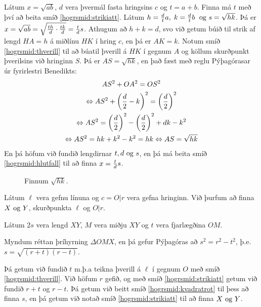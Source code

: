 \begin{frame}[allowframebreaks]
  \begin{hogrsmid}\label{hogrsmid:kvadratrot}
    Látum \(x = \sqrt{ab}\), \(d\) vera þvermál fasta hringsins \(c\)
    og \(t = a+b\).
    Finna má \(t\) með því að beita smíð \ref{hogrsmid:strikiatt}.
    Látum \(h =\frac{d}{t}a, \; k = \frac{d}{t}b \; \text{ og } s = \sqrt{hk}\).
    Þá er \(x = \sqrt{ab} = \sqrt{\frac{th}{d} \cdot \frac{tk}{d}} = \frac{t}{d}s\).
    Athugum að \(h+k = d\), svo við getum búið til strik af lengd
    \(HA = h\) á miðlínu \(HK\) í hring \(c\), en þá er \(AK = k\).
    Notum smíð \ref{hogrsmid:thverill} til að búatil þverill á \(HK\) í
    gegnum \(A\) og köllum skurðpunkt þverilsins við hringinn \(S\).
    \theorembreak
    Þá er \(AS = \sqrt{hk}\), en það fæst með reglu
    Pýþagórasar úr fyrirlestri Benedikts:
    \begin{gather*}
      AS^2 + OA^2 = OS^2\\
      \Leftrightarrow AS^2 + \left(\frac{d}{2} - k \right)^2 = \left(\frac{d}{2} \right)^2\\
    \Leftrightarrow AS^2 = \left( \frac{d}{2} \right)^2 - \left( \frac{d}{2} \right)^2 + dk - k^2 \\
    \Leftrightarrow AS^2 = hk + k^2 - k^2 = hk
    \Leftrightarrow AS = \sqrt{hk}
  \end{gather*}
  En þá höfum við fundið lengdirnar \(t, d \text{ og } s\), en þá má beita
  smíð \ref{hogrsmid:hlutfall} til að finna \(x = \frac{t}{d}s\).
  \end{hogrsmid}
\end{frame}

\begin{frame}
  \begin{figure}[H]
    \centering

    \caption{Finnum \(\sqrt{hk}\).}
    \label{fig:kvadratrot}
  \end{figure}
\end{frame}

\begin{frame}
  \begin{hogrsmid}\label{hogrsmid:skplinuoghrings}
    Látum \(\ell\) vera gefnu línuna og \(c = O|r\) vera gefna hringinn.
    Við þurfum að finna \(X \text{ og } Y\), skurðpunkta \(\ell\) og \(O|r\).

    Látum \(2s\) vera lengd \(XY\), \(M\) vera miðju \(XY\) og
    \(t\) vera fjarlægðina \(OM\).

    Myndum réttan þríhyrning \(\Delta OMX\),
    en þá gefur Pýþagóras að \(s^2 = r^2 - t^2\), þ.e.
    \(s = \sqrt{(r+t)(r-t)}\).

    Þá getum við fundið \(t\) m.þ.a teikna þverill á \(\ell\) í gegnum
    \(O\) með smíð \ref{hogrsmid:thverill}. Við höfum \(r\) gefið, og
    með smíð \ref{hogrsmid:strikiatt} getum við fundið \(r+t\) og \(r-t\).
    Þá getum við beitt smíð \ref{hogrsmid:kvadratrot} til þess að finna
    \(s\), en þá getum við notað smíð \ref{hogrsmid:strikiatt} til að finna
    \(X \text{ og } Y\).
  \end{hogrsmid}
\end{frame}


